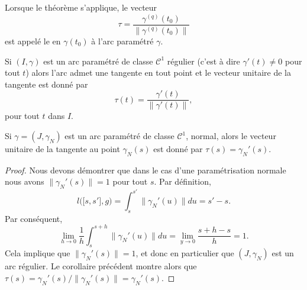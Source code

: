 Lorsque le théorème s'applique, le vecteur
\begin{equation}
\tau=\frac{ \gamma^{(q)}(t_0) }{ \| \gamma^{(q)}(t_0) \| }
\end{equation}
est appelé le  en $\gamma(t_0)$ à l'arc paramétré $\gamma$.


\begin{corollary}       \label{CorTgSoCun}
Si $(I,\gamma)$ est un arc paramétré de classe $\mathcal{C}^1$ régulier (c'est à dire $\gamma'(t)\neq 0$ pour tout $t$) alors l'arc admet une tangente en tout point et le vecteur unitaire de la tangente est donné par
\begin{equation}
    \tau(t)=\frac{ \gamma'(t) }{ \| \gamma'(t) \| },
\end{equation}
pour tout $t$ dans $I$.
\end{corollary}

\begin{corollary}       \label{CorUnitTgtaugpnorma}
Si $\gamma=(J,\gamma_N)$ est un arc paramétré de classe $\mathcal{C}^1$, normal, alors le vecteur unitaire de la tangente au point $\gamma_N(s)$ est donné par $\tau(s)=\gamma_N'(s)$.
\end{corollary}

\begin{proof}
Nous devons démontrer que dans le cas d'une paramétrisation normale nous avons $\| \gamma_N'(s) \|=1$ pour tout $s$. Par définition,
\begin{equation}
    l\big( \mathopen[ s , s' \mathclose],g \big)=\int_s^{s'}\| \gamma_N'(u) \|du=s'-s.
\end{equation}
Par conséquent,
\begin{equation}
    \lim_{h\to 0} \frac{1}{ h }\int_s^{s+h}\| \gamma_N'(u) \|du=\lim_{y\to 0} \frac{ s+h-s }{ h }=1.
\end{equation}
Cela implique que $\| \gamma_N'(s) \|=1$, et donc en particulier que $(J,\gamma_N)$ est un arc régulier. Le corollaire précédent montre alors que $\tau(s)=\gamma_N'(s)/\| \gamma_N'(s) \|=\gamma_N'(s)$.
\end{proof}

